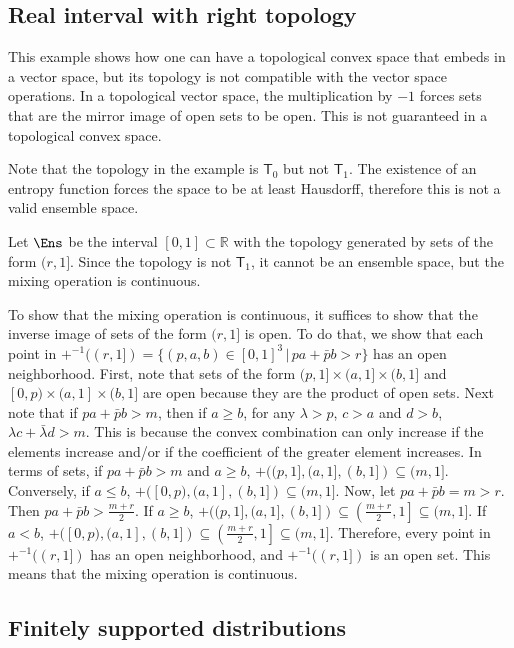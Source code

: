 \subsection{Real interval with right topology}

This example shows how one can have a topological convex space that embeds in a vector space, but its topology is not compatible with the vector space operations. In a topological vector space, the multiplication by $-1$ forces sets that are the mirror image of open sets to be open. This is not guaranteed in a topological convex space.

Note that the topology in the example is $\mathsf{T}_0$ but not $\mathsf{T}_1$. The existence of an entropy function forces the space to be at least Hausdorff, therefore this is not a valid ensemble space.

\begin{example}
	Let $\Ens$ be the interval $[0,1] \subset \mathbb{R}$ with the topology generated by sets of the form $(r,1]$. Since the topology is not $\mathsf{T}_1$, it cannot be an ensemble space, but the mixing operation is continuous.
\end{example}

To show that the mixing operation is continuous, it suffices to show that the inverse image of sets of the form $(r,1]$ is open. To do that, we show that each point in $+^{-1}((r,1]) = \{(p, a, b) \in [0,1]^3 \, | \, pa+\bar{p}b > r \}$ has an open neighborhood. First, note that sets of the form $(p,1]\times(a,1]\times(b,1]$ and $[0,p)\times(a,1]\times(b,1]$ are open because they are the product of open sets. Next note that if $pa+\bar{p}b>m$, then if $a\geq b$, for any $\lambda>p$, $c>a$ and $d>b$, $\lambda c+\bar{\lambda}d>m$. This is because the convex combination can only increase if the elements increase and/or if the coefficient of the greater element increases. In terms of sets, if $pa+\bar{p}b>m$ and $a \geq b$, $+((p,1],(a,1],(b,1]) \subseteq (m,1]$. Conversely, if $a\leq b$, $+([0,p),(a,1],(b,1]) \subseteq (m,1]$. Now, let $pa+\bar{p}b=m>r$. Then $pa+\bar{p}b>\frac{m+r}{2}$. If $a \geq b$, $+((p,1],(a,1],(b,1]) \subseteq \left(\frac{m+r}{2},1\right]\subseteq (m,1]$. If $a<b$,  $+([0,p),(a,1],(b,1]) \subseteq \left(\frac{m+r}{2},1\right]\subseteq (m,1]$. Therefore, every point in $+^{-1}((r,1])$ has an open neighborhood, and $+^{-1}((r,1])$ is an open set. This means that the mixing operation is continuous.

\subsection{Finitely supported distributions}

